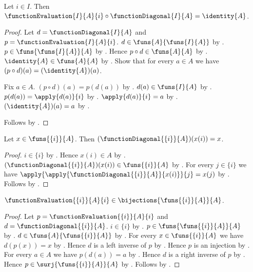 \begin{theorem}\label{function_evaluation_diagonal}
    Let $i\in I$.
    Then $\functionEvaluation{I}{A}{i}\circ\functionDiagonal{I}{A}=\identity{A}$.
\end{theorem}
\begin{proof}
    Let $d=\functionDiagonal{I}{A}$ and $p=\functionEvaluation{I}{A}{i}$.
    $d\in\funs{A}{\funs{I}{A}}$ by .
    $p\in\funs{\funs{I}{A}}{A}$ by .
    Hence $p\circ d\in\funs{A}{A}$ by .
    $\identity{A}\in\funs{A}{A}$ by .
    Show that for every $a\in A$ we have $(p\circ d)(a)=(\identity{A})(a)$.
    \begin{subproof}
        Fix $a\in A$.
        $(p\circ d)(a)=p(d(a))$ by
            .
        $d(a)\in\funs{I}{A}$ by .
        $p(d(a))=\apply{d(a)}{i}$ by .
        $\apply{d(a)}{i}=a$ by .
        $(\identity{A})(a)=a$ by .
    \end{subproof}
    Follows by .
\end{proof}

\begin{proposition}\label{function_diagonal_singleton}
    Let $x\in\funs{\{i\}}{A}$.
    Then $(\functionDiagonal{\{i\}}{A})(x(i))=x$.
\end{proposition}
\begin{proof}
    $i\in\{i\}$ by .
    Hence $x(i)\in A$ by .
    $(\functionDiagonal{\{i\}}{A})(x(i))\in\funs{\{i\}}{A}$ by
        .
    For every $j\in\{i\}$ we have
        $\apply{\apply{\functionDiagonal{\{i\}}{A}}{x(i)}}{j}=x(j)$ by
        .
    Follows by .
\end{proof}

\begin{theorem}\label{singleton_evaluation_bijection}
    $\functionEvaluation{\{i\}}{A}{i}\in\bijections{\funs{\{i\}}{A}}{A}$.
\end{theorem}
\begin{proof}
    Let $p=\functionEvaluation{\{i\}}{A}{i}$ and $d=\functionDiagonal{\{i\}}{A}$.
    $i\in\{i\}$ by .
    $p\in\funs{\funs{\{i\}}{A}}{A}$ by .
    $d\in\funs{A}{\funs{\{i\}}{A}}$ by .
    For every $x\in\funs{\{i\}}{A}$ we have $d(p(x))=x$ by
        .
    Hence $d$ is a left inverse of $p$ by .
    Hence $p$ is an injection by .
    For every $a\in A$ we have $p(d(a))=a$ by
        .
    Hence $d$ is a right inverse of $p$ by .
    Hence $p\in\surj{\funs{\{i\}}{A}}{A}$ by .
    Follows by .
\end{proof}

